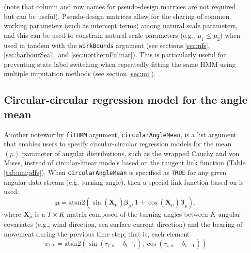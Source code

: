 \documentclass[12pt]{article}\usepackage[]{graphicx}\usepackage[]{xcolor}
\begin{document}
\noindent (note that column and row names for pseudo-design matrices are not required but can be useful). Pseudo-design matrices allow for the sharing of common working parameters (such as intercept terms) among natural scale parameters, and this can be used to constrain natural scale parameters (e.g., $\mu_1 \le \mu_2$) when used in tandem with the \verb|workBounds| argument (see sections \ref{sec:nfs}, \ref{sec:harbourSeal}, and \ref{sec:northernFulmar}).  This is particularly useful for preventing state label switching when repeatedly fitting the same HMM using multiple imputation methods (see section \ref{sec:mi}).

\subsection{Circular-circular regression model for the angle mean}
\label{sec:circ}
Another noteworthy \verb|fitHMM| argument, \verb|circularAngleMean|, is a list argument that enables users to specify circular-circular regression models for the mean $(\mu)$ parameter of angular distributions, such as the wrapped Cauchy and von Mises, instead of circular-linear models based on the tangent link function (Table \ref{tab:unipdfs}). When \verb|circularAngleMean| is specified as \verb|TRUE| for any given angular data stream (e.g. turning angle), then a special link function based on \cite{RivestEtAl2016} is used:
\begin{equation}
  {\boldsymbol \mu}=\text{atan2}(\sin({\mathbf X}_\mu){\boldsymbol \beta}_\mu,1+\cos({\mathbf X}_\mu){\boldsymbol \beta}_\mu),
  \label{eq:circ}
\end{equation}
where ${\mathbf X}_\mu$ is a $T \times K$ matrix composed of the turning angles between $K$ angular covariates (e.g., wind direction, sea surface current direction) and the bearing of movement during the previous time step; that is, each element 
\begin{equation}
x_{t,k}=\text{atan2}(\sin(r_{t,k}-b_{t-1}),\cos(r_{t,k}-b_{t-1})) 
  \label{eq:angleCov}
\end{equation}
\end{document}

